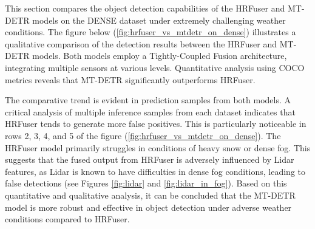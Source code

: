 \documentclass[report.tex]{subfiles}
\begin{document}
    This section compares the object detection capabilities of the HRFuser and MT-DETR models on the DENSE dataset under extremely challenging weather conditions. The figure below (\ref{fig:hrfuser_vs_mtdetr_on_dense}) illustrates a qualitative comparison of the detection results between the HRFuser and MT-DETR models. Both models employ a Tightly-Coupled Fusion architecture, integrating multiple sensors at various levels. Quantitative analysis using COCO metrics reveals that MT-DETR significantly outperforms HRFuser.

    The comparative trend is evident in prediction samples from both models. A critical analysis of multiple inference samples from each dataset indicates that HRFuser tends to generate more false positives. This is particularly noticeable in rows 2, 3, 4, and 5 of the figure (\ref{fig:hrfuser_vs_mtdetr_on_dense}). The HRFuser model primarily struggles in conditions of heavy snow or dense fog. This suggests that the fused output from HRFuser is adversely influenced by Lidar features, as Lidar is known to have difficulties in dense fog conditions, leading to false detections (see Figures \ref{fig:lidar} and \ref{fig:lidar_in_fog}). Based on this quantitative and qualitative analysis, it can be concluded that the MT-DETR model is more robust and effective in object detection under adverse weather conditions compared to HRFuser.
    
\end{document}
